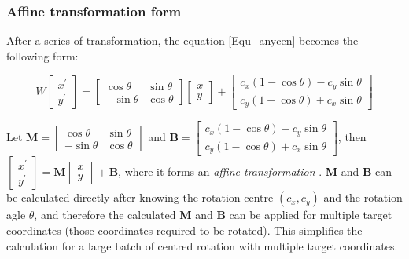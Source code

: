 \subsubsection{Affine transformation form}
After a series of transformation, the equation \ref{Equ_anycen} becomes the following form:

\begin{equation} \label{Equ_aff}W
  \begin{bmatrix}
   x^{'} \\ y^{'}
   \end{bmatrix}  = \begin{bmatrix} \cos\theta & \sin\theta \\ -\sin\theta & \cos\theta \end{bmatrix} \begin{bmatrix} x \\ y \end{bmatrix}
+ \begin{bmatrix} c_{x}(1 - \cos\theta) - c_{y}\sin\theta \\ c_{y}(1 - \cos\theta) + c_{x}\sin\theta \end{bmatrix}
\end{equation}

\par\noindent
Let $ \textbf{M} = \begin{bmatrix} \cos\theta & \sin\theta \\ -\sin\theta & \cos\theta \end{bmatrix} $
and $ \textbf{B} = \begin{bmatrix} c_{x}(1 - \cos\theta) - c_{y}\sin\theta \\ c_{y}(1 - \cos\theta) + c_{x}\sin\theta \end{bmatrix}$, then $ \begin{bmatrix} x^{'} \\ y^{'} \end{bmatrix}  = \textbf{M} \begin{bmatrix} x \\ y \end{bmatrix} + \textbf{B}$,
where it forms an \textit{affine transformation} \cite{WolframAT}. \textbf{M} and \textbf{B} can be calculated directly after knowing the rotation centre $(c_{x}, c_{y})$ and the
rotation agle $\theta$, and therefore the calculated \textbf{M} and  \textbf{B} can be applied for multiple target coordinates (those coordinates required to be rotated). This simplifies the calculation for a large batch of centred rotation with multiple target coordinates.





